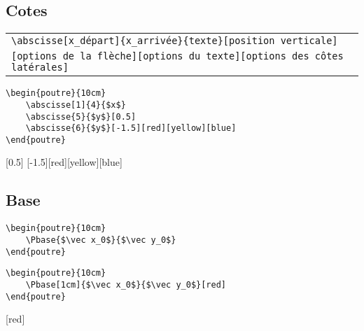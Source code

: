 \documentclass[a4paper,10pt]{article}
\begin{document}
  

    \subsection{Cotes}
	
            \begin{center}
                \begin{tabular}{|l|}
                    \hline
                    \verb!\abscisse[x_départ]{x_arrivée}{texte}[position verticale]!\\
                    \verb![options de la flèche][options du texte][options des côtes latérales]!
                    \\\hline
                \end{tabular}
            \end{center}
            
           \begin{verbatim}
\begin{poutre}{10cm}
	\abscisse[1]{4}{$x$}
	\abscisse{5}{$y$}[0.5]
	\abscisse{6}{$y$}[-1.5][red][yellow][blue]
\end{poutre}
        \end{verbatim}

\begin{poutre}{10cm}
	[0.5]
	[-1.5][red][yellow][blue]
\end{poutre}

    \subsection{Base}
	
	
           \begin{verbatim}
\begin{poutre}{10cm}
	\Pbase{$\vec x_0$}{$\vec y_0$}
\end{poutre}
        \end{verbatim}

\begin{poutre}{10cm}
\end{poutre}
	
	
	
           \begin{verbatim}
\begin{poutre}{10cm}
	\Pbase[1cm]{$\vec x_0$}{$\vec y_0$}[red]
\end{poutre}
        \end{verbatim}

\begin{poutre}{10cm}
	[red]
\end{poutre}


\end{document}
